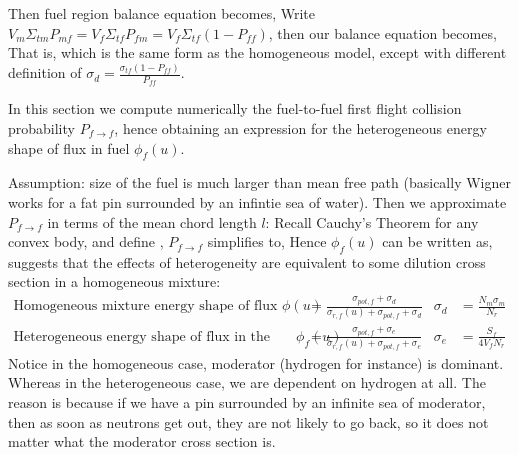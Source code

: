 \documentclass{school-22.211-notes}
\begin{document}
\begin{enumerate}
Then fuel region balance equation becomes,
Write $V_m \Sigma_{tm} P_{mf} = V_f \Sigma_{tf} P_{fm} = V_f \Sigma_{tf} (1- P_{ff})$, then our balance equation becomes, 
That is, 
which is the same form as the homogeneous model, except with  different definition of $\sigma_d = \frac{\sigma_{tf} (1 - P_{ff})}{P_{ff}}$. 
\end{enumerate}


\clearpage
{}
In this section we compute numerically the fuel-to-fuel first flight collision probability $P_{f\to f}$, hence obtaining an expression for the heterogeneous energy shape of flux in fuel $\phi_f(u)$. 

Assumption: size of the fuel is much larger than mean free path (basically Wigner works for a fat pin surrounded by an infintie sea of water). Then we approximate $P_{f\to f}$ in terms of the mean chord length $l$: 
Recall Cauchy's Theorem for any convex body, 
and define ,
$P_{f\to f}$ simplifies to, 
Hence $\phi_f(u)$ can be written as, 
\\
 suggests that the effects of heterogeneity are equivalent to some dilution cross section in a homogeneous mixture:
\begin{align}
\mbox{Homogeneous mixture energy shape of flux } \phi(u) &= \frac{\sigma_{pot, f} + \sigma_d}{\sigma_{r,f} (u) + \sigma_{pot, f} + \sigma_d}   & \sigma_d &= \frac{N_m \sigma_m}{N_r}  \\
\mbox{Heterogeneous energy shape of flux in the fuel } \phi_f(u) &= \frac{\sigma_{pot, f} + \sigma_e}{\sigma_{r,f} (u) + \sigma_{pot, f} + \sigma_e}   & \sigma_e &= \frac{S_f}{4 V_f N_r} 
\end{align}
Notice in the homogeneous case, moderator (hydrogen for instance) is dominant. Whereas in the heterogeneous case, we are dependent on hydrogen at all. The reason is because if we have a pin surrounded by an infinite sea of moderator, then as soon as neutrons get out, they are not likely to go back, so it does not matter what the moderator cross section is. 
\end{document}
